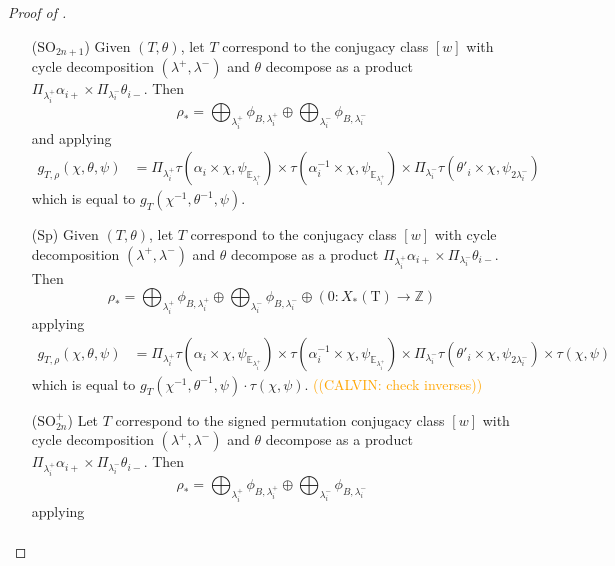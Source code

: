 \documentclass[12pt, reqno]{amsart}
\theoremstyle{definition}
\theoremstyle{definition}
\theoremstyle{definition}
\newcommand{\fieldCharacter}{\psi}
\newcommand{\quadraticExtension}{\mathbb{E}}
\newcommand{\quadraticFieldExtension}[1]{\quadraticExtension_{#1}}
\newcommand{\GaussSumCharacter}[3]{\tau\left(#1 \times #2, #3\right)}
\newcommand{\algebraicGroup}[1]{\boldsymbol{\mathrm{#1}}}
\newcommand{\calvin}[1]{\textcolor{orange}{\sffamily ((CALVIN: #1))}}
\begin{document}
\begin{proof}[Proof of ]
\begin{enumerate}
\begin{comment}
	\end{comment}
	\item[($\algebraicGroup{SO}_{2n+1}$)] Given $(T,\theta)$, let $T$ correspond to the conjugacy class $[w]$ with cycle decomposition $(\lambda^+,\lambda^-)$ 
	and $\theta$ decompose as a product $\Pi_{\lambda_i^+ }\alpha_{i+} \times \Pi_{\lambda_i^-}\theta_{i-}$. Then
	$$\rho_* = \bigoplus_{\lambda_i^+} \phi_{B,\lambda_i^+} \oplus \bigoplus_{\lambda_i^-} \phi_{B,\lambda_i^-} $$
	and applying 
	\begin{align*}
		g_{T,\rho}(\chi,\theta,\psi) &= \Pi_{\lambda_i^+} \GaussSumCharacter{\alpha_i}{\chi}{\fieldCharacter_{\quadraticFieldExtension{\lambda_i^+}}} \times \GaussSumCharacter{\alpha_i^{-1}}{\chi}{\fieldCharacter_{\quadraticFieldExtension{\lambda_i^+}}} \times \Pi_{\lambda_i^-} \GaussSumCharacter{\theta'_i}{\chi}{\fieldCharacter_{2\lambda_i^-}} 
	\end{align*}
	which is equal to $g_{T}(\chi^{-1},\theta^{-1},\psi)$.
	\item[($\algebraicGroup{Sp}$)] Given $(T,\theta)$, let $T$ correspond to the conjugacy class $[w]$ with cycle decomposition $(\lambda^+,\lambda^-)$ 
	and $\theta$ decompose as a product $\Pi_{\lambda_i^+ }\alpha_{i+} \times \Pi_{\lambda_i^-}\theta_{i-}$. Then
	$$\rho_* = \bigoplus_{\lambda_i^+} \phi_{B,\lambda_i^+} \oplus \bigoplus_{\lambda_i^-} \phi_{B,\lambda_i^-} \oplus \left(0:X_*(\algebraicGroup{T}) \to \mathbb{Z}\right)$$
	applying 
	\begin{align*}
		g_{T,\rho}(\chi,\theta,\psi) &= \Pi_{\lambda_i^+} \GaussSumCharacter{\alpha_i}{\chi}{\fieldCharacter_{\quadraticFieldExtension{\lambda_i^+}}} \times \GaussSumCharacter{\alpha_i^{-1}}{\chi}{\fieldCharacter_{\quadraticFieldExtension{\lambda_i^+}}} \times \Pi_{\lambda_i^-} \GaussSumCharacter{\theta'_i}{\chi}{\fieldCharacter_{2\lambda_i^-}} \times \tau(\chi,\psi)
	\end{align*}
	which is equal to $g_{T}(\chi^{-1},\theta^{-1},\psi) \cdot \tau(\chi,\psi)$. \calvin{check inverses}
	\item[($\algebraicGroup{SO}_{2n}^+$)] Let $T$ correspond to the signed permutation conjugacy class $[w]$ with cycle decomposition $(\lambda^+,\lambda^-)$ 
	and $\theta$ decompose as a product $\Pi_{\lambda_i^+ }\alpha_{i+} \times \Pi_{\lambda_i^-}\theta_{i-}$. Then
	$$\rho_* = \bigoplus_{\lambda_i^+} \phi_{B,\lambda_i^+} \oplus \bigoplus_{\lambda_i^-} \phi_{B,\lambda_i^-}$$
	applying 
	\begin{align*}

\end{align*}
\end{enumerate}
\end{proof}
\end{document}
